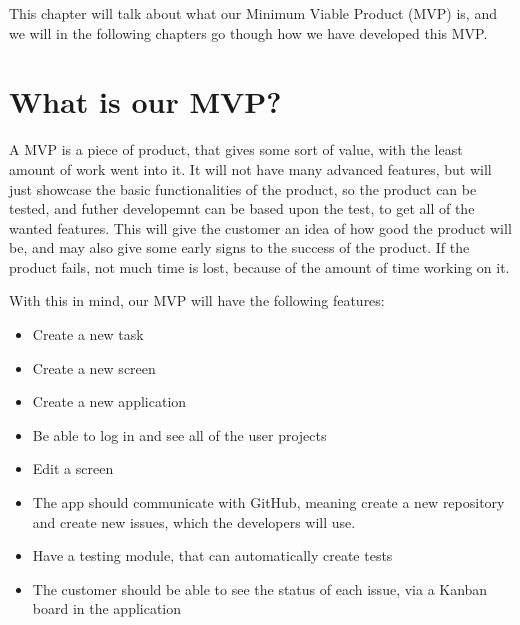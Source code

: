 This chapter will talk about what our Minimum Viable Product (MVP) is, and we will in the following chapters go though how we have developed this MVP.

\section{What is our MVP?}
A MVP is a piece of product, that gives some sort of value, with the least amount of work went into it.
It will not have many advanced features, but will just showcase the basic functionalities of the product, so the product can be tested, and futher developemnt can be based upon the test, to get all of the wanted features.
This will give the customer an idea of how good the product will be, and may also give some early signs to the success of the product. 
If the product fails, not much time is lost, because of the amount of time working on it. \cite{whatIsMVP}

With this in mind, our MVP will have the following features:

\begin{itemize}
    \item Create a new task
    \item Create a new screen
    \item Create a new application
    \item Be able to log in and see all of the user projects
    \item Edit a screen 
    \item The app should communicate with GitHub, meaning create a new repository and create new issues, which the developers will use.
    \item Have a testing module, that can automatically create tests
    \item The customer should be able to see the status of each issue, via a Kanban board in the application
\end{itemize}
